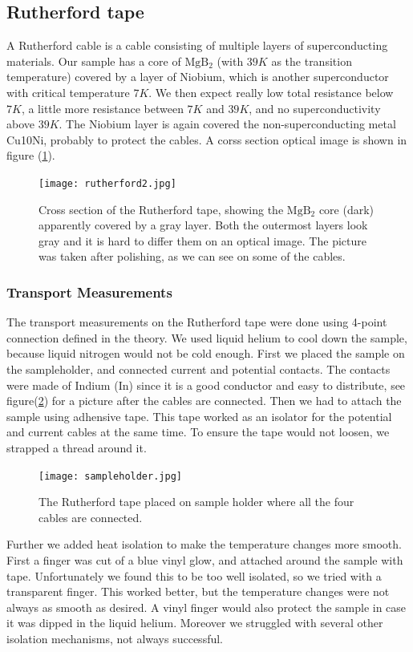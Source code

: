 \documentclass{comjnl}
\newcommand*\chem[1]{\ensuremath{\mathrm{#1}}}
\begin{document}
\subsection{Rutherford tape}
A Rutherford cable is a cable consisting of multiple layers of superconducting materials. Our sample has a core of \chem{MgB_2} (with $39K$ as the transition temperature) covered by a layer of Niobium, which is another superconductor with critical temperature $7K$. We then expect really low total resistance below $7K$, a little more resistance between $7K$ and $39K$, and no superconductivity above $39K$. The Niobium layer is again covered the non-superconducting metal Cu10Ni, probably to protect the cables. A corss section optical image is shown in figure (\ref{fig:rutherford2}).
\begin{figure}[h]
\centering
\texttt{[image: rutherford2.jpg]}
\caption{Cross section of the Rutherford tape, showing the \chem{MgB_2} core (dark) apparently covered by a gray layer. Both the outermost layers look gray and it is hard to differ them on an optical image. The picture was taken after polishing, as we can see on some of the cables. \label{fig:rutherford2}}
\end{figure}

\subsubsection{Transport Measurements}
The transport measurements on the Rutherford tape were done using 4-point connection defined in the theory. We used liquid helium to cool down the sample, because liquid nitrogen would not be cold enough. First we placed the sample on the sampleholder, and connected current and potential contacts. The contacts were made of Indium (In) since it is a good conductor and easy to distribute, see figure(\ref{fig:sampleholder}) for a picture after the cables are connected. Then we had to attach the sample using adhensive tape. This tape worked as an isolator for the potential and current cables at the same time. To ensure the tape would not loosen, we strapped a thread around it. 

\begin{figure}[h]
\centering
\texttt{[image: sampleholder.jpg]}
\caption{The Rutherford tape placed on sample holder where all the four cables are connected.  \label{fig:sampleholder}}
\end{figure}

Further we added heat isolation to make the temperature changes more smooth. First a finger was cut of a blue vinyl glow, and attached around the sample with tape. Unfortunately we found this to be too well isolated, so we tried with a transparent finger. This worked better, but the temperature changes were not always as smooth as desired. A vinyl finger would also protect the sample in case it was dipped in the liquid helium. Moreover we struggled with several other isolation mechanisms, not always successful. 
\end{document}
